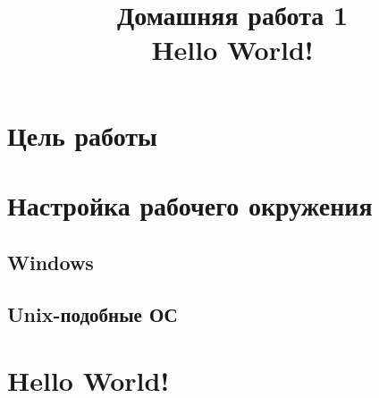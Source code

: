 \documentclass[14pt]{extarticle}
\title{Домашняя работа 1 \\ Hello World!}
\begin{document}
\maketitle

\tableofcontents

\section{Цель работы}

\section{Настройка рабочего окружения}

\subsection{Windows}

\subsection{Unix-подобные ОС}

\section{Hello World!}
\end{document}
